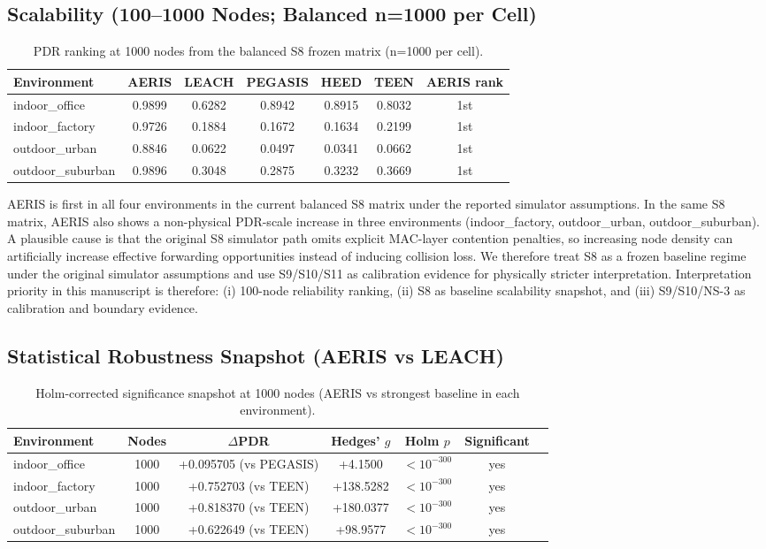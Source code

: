 ﻿\documentclass[sensors,article,submit,moreauthors,pdftex]{Definitions/mdpi}
\begin{document}
\subsection{Scalability (100--1000 Nodes; Balanced n=1000 per Cell)}
\begin{table}[H]
\caption{PDR ranking at 1000 nodes from the balanced S8 frozen matrix (n=1000 per cell).}
\label{tab:scale1000}
\centering
\begin{tabular}{lcccccc}
\toprule
Environment & AERIS & LEACH & PEGASIS & HEED & TEEN & AERIS rank \\
\midrule
indoor\_office    & 0.9899 & 0.6282 & 0.8942 & 0.8915 & 0.8032 & 1st \\
indoor\_factory   & 0.9726 & 0.1884 & 0.1672 & 0.1634 & 0.2199 & 1st \\
outdoor\_urban    & 0.8846 & 0.0622 & 0.0497 & 0.0341 & 0.0662 & 1st \\
outdoor\_suburban & 0.9896 & 0.3048 & 0.2875 & 0.3232 & 0.3669 & 1st \\
\bottomrule
\end{tabular}
\end{table}

AERIS is first in all four environments in the current balanced S8 matrix under the reported simulator assumptions.
In the same S8 matrix, AERIS also shows a non-physical PDR-scale increase in three environments (indoor\_factory, outdoor\_urban, outdoor\_suburban). A plausible cause is that the original S8 simulator path omits explicit MAC-layer contention penalties, so increasing node density can artificially increase effective forwarding opportunities instead of inducing collision loss. We therefore treat S8 as a frozen baseline regime under the original simulator assumptions and use S9/S10/S11 as calibration evidence for physically stricter interpretation.
Interpretation priority in this manuscript is therefore: (i) 100-node reliability ranking, (ii) S8 as baseline scalability snapshot, and (iii) S9/S10/NS-3 as calibration and boundary evidence.

\subsection{Statistical Robustness Snapshot (AERIS vs LEACH)}
\begin{table}[H]
\caption{Holm-corrected significance snapshot at 1000 nodes (AERIS vs strongest baseline in each environment).}
\label{tab:robust_snapshot}
\centering
\begin{tabular}{lcccccc}
\toprule
Environment & Nodes & $\Delta$PDR & Hedges' $g$ & Holm $p$ & Significant \\
\midrule
indoor\_office    & 1000 & +0.095705 (vs PEGASIS) & +4.1500 & $<10^{-300}$ & yes \\
indoor\_factory   & 1000 & +0.752703 (vs TEEN) & +138.5282 & $<10^{-300}$ & yes \\
outdoor\_urban    & 1000 & +0.818370 (vs TEEN) & +180.0377 & $<10^{-300}$ & yes \\
outdoor\_suburban & 1000 & +0.622649 (vs TEEN) & +98.9577 & $<10^{-300}$ & yes \\
\bottomrule
\end{tabular}
\end{table}
\end{document}
